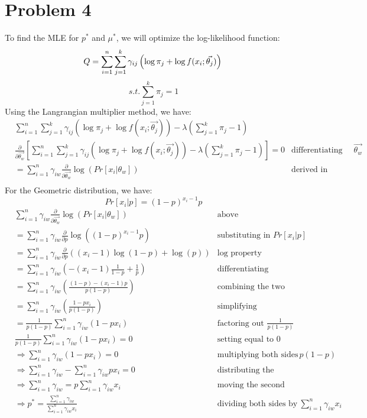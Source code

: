 \documentclass[11pt]{article}
\newcommand{\pd}[1]{\frac{\partial}{\partial #1}}
\begin{document}
\newpage

\section*{Problem 4}
To find the MLE for $p^*$ and $\mu^*$, we will optimize the log-likelihood function:
\[
	Q = \sum_{i=1}^{n} \sum_{j=1}^{k} \gamma_{ij} \left( \log \pi_j + \log f(x_i; \vec{\theta_j}) \right) \\
\]
\[s.t. \sum_{j=1}^{k} \pi_j = 1\]
Using the Langrangian multiplier method, we have:
\begin{align*}
	& \sum_{i=1}^{n} \sum_{j=1}^{k} \gamma_{ij} \left( \log \pi_j + \log f(x_i; \vec{\theta_j}) \right) - \lambda \left( \sum_{j=1}^{k} \pi_j - 1 \right) & \\
	& \pd{\vec{\theta_w}} \left[ \sum_{i=1}^{n} \sum_{j=1}^{k} \gamma_{ij} \left( \log \pi_j + \log f(x_i; \vec{\theta_j}) \right) - \lambda \left( \sum_{j=1}^{k} \pi_j - 1 \right) \right] = 0 & \text{differentiating w.r.t. } \vec{\theta_w} \\
	&= \sum_{i=1}^{n} \gamma_{iw} \pd{\vec{\theta_w}} \log \left( Pr[x_i | \theta_w] \right) & \text{derived in lecture} \\
\end{align*}
For the Geometric distribution, we have:
\[
	Pr[x_i | p] = (1 - p)^{x_i - 1} p
\]
\begin{align*}
	& \sum_{i=1}^{n} \gamma_{iw} \pd{\vec{\theta_w}} \log \left( Pr[x_i | \theta_w] \right) & \text{above} \\ 
	&= \sum_{i=1}^{n} \gamma_{iw} \pd{p} \log \left( (1 - p)^{x_i - 1} p \right) & \text{substituting in } Pr[x_i | p] \\
	&= \sum_{i=1}^{n} \gamma_{iw} \pd{p} \left( (x_i - 1) \log(1 - p) + \log(p) \right) & \text{log property} \\
	&= \sum_{i=1}^{n} \gamma_{iw} \left( - (x_i - 1) \frac{1}{1 - p} + \frac{1}{p} \right) & \text{differentiating} \\
	&= \sum_{i=1}^{n} \gamma_{iw} \left( \frac{(1 - p) - (x_i - 1)p}{p(1 - p)} \right) & \text{combining the two fractions} \\
	&= \sum_{i=1}^{n} \gamma_{iw} \left( \frac{1 - px_i}{p(1 - p)} \right) & \text{simplifying} \\
	&= \frac{1}{p(1 - p)} \sum_{i=1}^{n} \gamma_{iw} (1 - px_i) & \text{factoring out } \frac{1}{p(1 - p)} \\
	& \frac{1}{p(1 - p)} \sum_{i=1}^{n} \gamma_{iw} (1 - px_i) = 0 & \text{setting equal to } 0 \\
	& \Rightarrow \sum_{i=1}^{n} \gamma_{iw} (1 - px_i) = 0 & \text{multiplying both sides by } p(1 - p) \\
	& \Rightarrow \sum_{i=1}^{n} \gamma_{iw} - \sum_{i = 1}^{n} \gamma_{iw} px_i = 0 & \text{distributing the summation} \\
	& \Rightarrow \sum_{i=1}^{n} \gamma_{iw} = p \sum_{i = 1}^{n} \gamma_{iw} x_i & \text{moving the second term to the right side} \\
	& \Rightarrow p^* = \frac{\sum_{i=1}^{n} \gamma_{iw}}{\sum_{i = 1}^{n} \gamma_{iw} x_i} & \text{dividing both sides by } \sum_{i = 1}^{n} \gamma_{iw} x_i \\
\end{align*}
\end{document}
